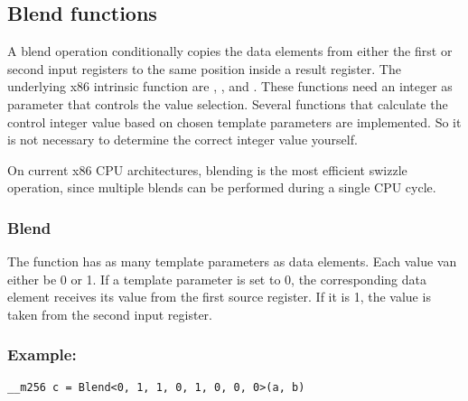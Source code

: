 \subsection{Blend functions}

A blend operation conditionally copies the data elements from either the first or second input registers to the same position inside a result register. 
The underlying x86 intrinsic function are , ,  and .
These functions need an integer as parameter that controls the value selection.
Several functions that calculate the control integer value based on chosen template parameters are implemented.
So it is not necessary to determine the correct integer value yourself.

On current x86 CPU architectures, blending is the most efficient swizzle operation, since multiple blends can be performed during a single CPU cycle.

\subsubsection{Blend}

The  function has as many template parameters as data elements.
Each value van either be 0 or 1.
If a template parameter is set to 0, the corresponding data element receives its value from the first source register.
If it is 1, the value is taken from the second input register.

\subsubsection*{Example:}
\begin{verbatim}
__m256 c = Blend<0, 1, 1, 0, 1, 0, 0, 0>(a, b)
\end{verbatim}



